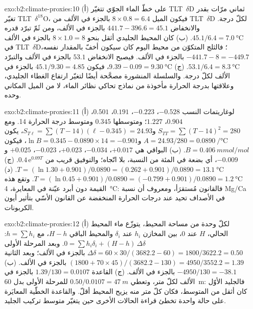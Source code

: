 \begin{solution}{exo:b2:climate-proxies:10}
(أ) على خطّ الماء الجوّي تتغيّر \mbox{\textdir TLT $\delta$D} ثماني مرّات بقدر تغيّر \mbox{\textdir TLT $\delta^{18}$O}، فيكون
الميل $8 \times 0.8 = 6.4$ بالجزء في الألف من \mbox{\textdir TLT $\delta$D} لكلّ درجة. والانخفاض $441.7 - 396.6 = 45.1$
بالجزء في الألف، ومن ثَمّ تبرّد قدره $45.1/6.4 = \qty{7.0}{\celsius}$. (ب) كان المحيط الجليدي أثقل بنحو
$8 \times 1.0 = 8$ بالجزء في الألف في \mbox{\textdir TLT $\delta$D}؛ فالثلج المتكوّن من محيط اليوم كان سيكون
أخفّ بالمقدار نفسه، $-441.7 - 8 = -449.7$ بالجزء في الألف. فيصبح الانخفاض $53.1$ بالجزء في الألف والتبرّد
$53.1/6.4 = \qty{8.3}{\celsius}$. (ج) $9.39 - 0.09 = \qty{9.30}{\celsius}$، فيكون $45.1/9.30 = 4.85$
بالجزء في الألف لكلّ درجة. والسلسلة المنشورة مصحَّحة أيضًا لتغيّر ارتفاع الغطاء
الجليدي، وعلاقتها بدرجة الحرارة مأخوذة من نماذج تحاكي نظائر الماء، لا من
الميل المكاني وحده.
\end{solution}

\begin{solution}{exo:b2:climate-proxies:11}
(أ) لوغاريتمات النسب $-0.528$، $-0.223$، $0.191$، $0.501$، $0.904$، $1.227$؛ ومتوسطها
$0.345$ ومتوسط درجة الحرارة 14. ومع $S_{TT} = \sum (T - 14)^2 = 280$ و$S_{T\ell} =
\sum (T - 14)(\ell - 0.345) = 24.93$، يكون $A = 24.93/280 = \qty{0.0890}{\per\celsius}$ و$\ln B =
0.345 - 0.0890 \times 14 = -0.901$، فيكون $B = \qty{0.406}{mmol/mol}$. (ب) البواقي هي
$+0.017$، $-0.034$، $+0.023$، $-0.023$، $+0.025$ و$-0.009$، أي بضعة في المئة من النسبة، بلا
اتّجاه؛ والتوفيق قريب من $0.4\,\mathrm{e}^{0.09T}$. (ج) $T = (\ln 1.30 + 0.901)/0.0890 = (0.262 +
0.901)/0.0890 = \qty{13.1}{\celsius}$. (د) $T = (\ln 0.45 + 0.901)/0.0890 = (-0.799 +
0.901)/0.0890 = \qty{1.2}{\celsius}$. وتقع هذه القيمة دون أبرد عيّنة في المعايرة،
\qty{4}{\celsius}: فالقانون مُستقرَأ، ومعروف أن نسبة Mg/Ca في الأصداف تحيد عند درجات الحرارة المنخفضة
عن القانون الأسّي بتأثير أيون الكربونات.
\end{solution}

\begin{solution}{exo:b2:climate-proxies:12}
(أ) لكلّ وحدة من مساحة المحيط، يتوزّع ماء المحيط الحالي، $H$ عند 0، بين المخازن
$h_i$ عند $\delta_i$ والمحيط الباقي $H - h$، مع $h = \sum h_i$: $0 = \sum h_i\delta_i +
(H - h)\,\Delta\delta$. وبعد المرحلة الأولى $\Delta\delta = 60 \times 30/(3682.2 - 60) =
1800/3622.2 = 0.50$ بالجزء في الألف؛ وبعد الثانية $(1800 + 70 \times 45)/(3682.2 - 130) =
4950/3552.2 = 1.39$ بالجزء في الألف. (ب) $-4950/130 = -38.1$ بالجزء في الألف. (ج) القاعدة $1.39/130 = 0.0107$
بالجزء في الألف لكلّ متر، وتعطي $0.50/0.0107 = \qty{47}{m}$ للمرحلة الأولى بدل
\qty{60}{m}: فالجليد الأوّل كان أثقل من المتوسط، فكان كلّ متر منه يزيح المحيط
أقلّ. والقاعدة الخطّية المعايَرة على حالة واحدة تخطئ قراءة الحالات الأخرى حين يتغيّر متوسط تركيب
الجليد.
\end{solution}

